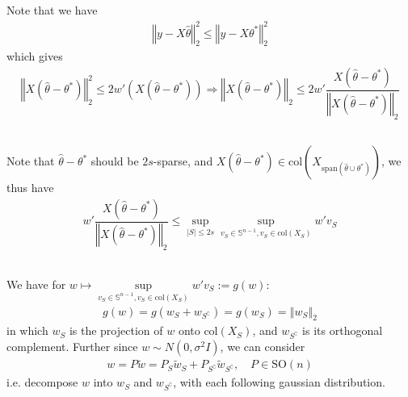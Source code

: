 \documentclass[11pt,a4paper]{article}
\numberwithin{equation}{section}%
\begin{document}
\subsection{}
Note that we have 
\begin{align*}
    \left\Vert y-X\hat{\theta } \right\Vert _2^2 \leq \left\Vert y-X\theta ^* \right\Vert _2^2
\end{align*}
which gives
\begin{align*}
     \left\Vert X(\hat{\theta }-\theta ^*) \right\Vert _2^2 \leq 2 w'\left( X(\hat{\theta }-\theta ^*) \right) \Rightarrow  \left\Vert X(\hat{\theta }-\theta ^*) \right\Vert _2 \leq 2 w'\dfrac{ X(\hat{\theta }-\theta ^*)  }{ \left\Vert X(\hat{\theta }-\theta ^*) \right\Vert _2 } 
\end{align*}

\subsection{}

Note that $ \hat{\theta }-\theta ^* $ should be $ 2s $-sparse, and $ X(\hat{\theta }-\theta ^*)\in \mathrm{col}(X_{\mathrm{ span }(\hat{\theta }\cup \theta ^*) }) $, we thus have
\begin{align*}
    w'\dfrac{ X(\hat{\theta }-\theta ^*)  }{ \left\Vert X(\hat{\theta }-\theta ^*) \right\Vert _2 } \leq \mathop{ \sup  }\limits_{\left\vert S  \right\vert \leq 2s }\mathop{ \sup  }\limits_{v_S\in \mathbb{S}^{n-1}, v_S\in \mathrm{ col  } (X_S)} w'v_S 
\end{align*}




\subsection{}
We have for $ w\mapsto \mathop{ \sup  }\limits_{v_S\in \mathbb{S}^{n-1}, v_S\in \mathrm{ col  } (X_S)} w'v_S := g(w) $:
\begin{align*}
    g(w)=g(w_S + w_{S^\complement}) = g(w_S)= \left\Vert w_S  \right\Vert _2
\end{align*}
in which $ w_S $ is the projection of $ w $ onto $ \mathrm{ col  } (X_S) $, and $ w_{S^\complement} $ is  its orthogonal complement. Further since $ w\sim N(0,\sigma ^2 I) $, we can consider 
\begin{align*}
    w = P\tilde{w} = P_S\tilde{w}_S + P_{S^\complement}\tilde{w}_{S^\complement} ,\quad P \in \mathrm{SO}(n)
\end{align*}
i.e. decompose $ w $ into $ w_S $ and $ w_{S^\complement} $, with each following gaussian distribution.
\end{document}
